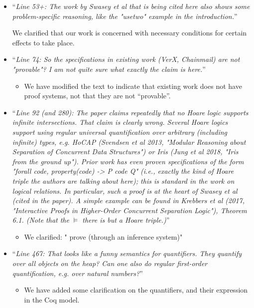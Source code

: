 \documentclass[11pt]{amsart}
\begin{document}
\begin{itemize}
\begin{itemize}
\item
``\emph{Line 53+: The work by Swasey et al that is being cited here also shows some problem-specific reasoning, like the "usetwo" example in the introduction.}''

We clarified that our work is concerned with necessary conditions for certain effects to take place. 

\item
``\emph{Line 74: So the specifications in existing work (VerX, Chainmail) are not "provable"? I am not quite sure what exactly the claim is here.}''
\begin{itemize}
\item
We have modified the text to indicate that existing work does not have proof systems, not that they are not ``provable''.
\end{itemize}

\item
``\emph{Line 92 (and 280): The paper claims repeatedly that no Hoare logic supports infinite intersections. That claim is clearly wrong. Several Hoare logics support using regular universal quantification over arbitrary (including infinite) types, e.g. HoCAP (Svendsen et al 2013, "Modular Reasoning about Separation of Concurrent Data Structures") or Iris (Jung et al 2018, "Iris from the ground up"). Prior work has even proven specifications of the form "forall code, property(code) -> {P} code {Q}" (i.e., exactly the kind of Hoare triple the authors are talking about here); this is standard in the work on logical relations. In particular, such a proof is at the heart of Swasey et al (cited in the paper). A simple example can be found in Krebbers et al (2017, "Interactive Proofs in Higher-Order Concurrent Separation Logic"), Theorem 6.1. (Note that the $\vDash$ there is but a Hoare triple.)}''
\begin{itemize}
\item
We clarified: " prove
(through an inference system)"
\end{itemize}

\item
``\emph{Line 467: That looks like a funny semantics for quantifiers. They quantify over all objects on the heap? Can one also do regular first-order quantification, e.g. over natural numbers?}''
\begin{itemize}
\item
We have added some clarification on the quantifiers, and their expression in the Coq model.
\end{itemize}


\end{itemize}
\end{itemize}
\end{document}

